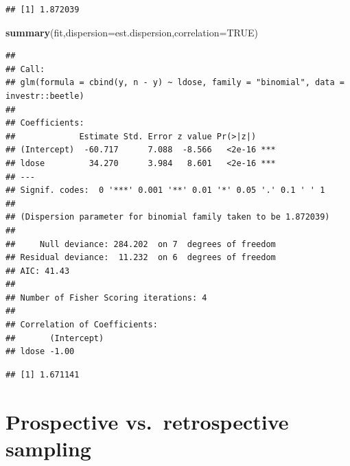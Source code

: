 \documentclass[
]{article}
\newenvironment{Shaded}{\begin{snugshade}}{\end{snugshade}}
\newcommand{\AttributeTok}[1]{\textcolor[rgb]{0.13,0.29,0.53}{#1}}
\newcommand{\CommentTok}[1]{\textcolor[rgb]{0.56,0.35,0.01}{\textit{#1}}}
\newcommand{\ConstantTok}[1]{\textcolor[rgb]{0.56,0.35,0.01}{#1}}
\newcommand{\FunctionTok}[1]{\textcolor[rgb]{0.13,0.29,0.53}{\textbf{#1}}}
\newcommand{\NormalTok}[1]{#1}
\newcommand{\OtherTok}[1]{\textcolor[rgb]{0.56,0.35,0.01}{#1}}
\newcommand{\SpecialCharTok}[1]{\textcolor[rgb]{0.81,0.36,0.00}{\textbf{#1}}}
\newcommand{\StringTok}[1]{\textcolor[rgb]{0.31,0.60,0.02}{#1}}
\begin{document}
\begin{verbatim}
## [1] 1.872039
\end{verbatim}

\begin{Shaded}
\begin{Highlighting}[]
\FunctionTok{summary}\NormalTok{(fit,}\AttributeTok{dispersion=}\NormalTok{est.dispersion,}\AttributeTok{correlation=}\ConstantTok{TRUE}\NormalTok{)}
\end{Highlighting}
\end{Shaded}

\begin{verbatim}
## 
## Call:
## glm(formula = cbind(y, n - y) ~ ldose, family = "binomial", data = investr::beetle)
## 
## Coefficients:
##             Estimate Std. Error z value Pr(>|z|)    
## (Intercept)  -60.717      7.088  -8.566   <2e-16 ***
## ldose         34.270      3.984   8.601   <2e-16 ***
## ---
## Signif. codes:  0 '***' 0.001 '**' 0.01 '*' 0.05 '.' 0.1 ' ' 1
## 
## (Dispersion parameter for binomial family taken to be 1.872039)
## 
##     Null deviance: 284.202  on 7  degrees of freedom
## Residual deviance:  11.232  on 6  degrees of freedom
## AIC: 41.43
## 
## Number of Fisher Scoring iterations: 4
## 
## Correlation of Coefficients:
##       (Intercept)
## ldose -1.00
\end{verbatim}

\begin{Shaded}
\end{Shaded}

\begin{verbatim}
## [1] 1.671141
\end{verbatim}

\hypertarget{prospective-vs.-retrospective-sampling}{%
\section{Prospective vs.~retrospective
sampling}\label{prospective-vs.-retrospective-sampling}}
\end{document}
